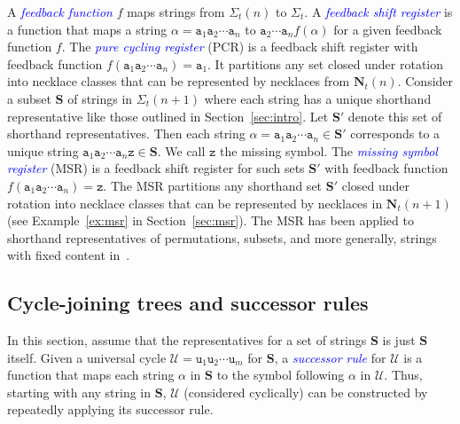 \documentclass[US-letter,USenglish,authorcolumns,autoref]{lipics-v2021}
\renewcommand{\tt} {\mathtt}
\newcommand{\bS}{\mathbf{S}}
\newcommand{\bN}{\mathbf{N}}
\newcommand{\defo}[1] {\emph{\textcolor{blue}{#1}}}
\DeclareMathOperator{\ap}{ap}
\begin{document}

   
A \defo{feedback function} $f$ maps strings from $\Sigma_t(n)$ to $\Sigma_t$.
A \defo{feedback shift register} is a function that maps a string $\alpha = \tt{a}_1\tt{a}_2 \cdots \tt{a}_n$ to $\tt{a}_2 \cdots \tt{a}_n f(\alpha)$ for a given feedback function $f$.  
The \defo{pure cycling register} (PCR) is a feedback shift register with feedback function $f(\tt{a}_1\tt{a}_2\cdots \tt{a}_n) = \tt{a}_1$.  It partitions any set closed under rotation into necklace classes that can be represented by necklaces from $\bN_t(n)$.   Consider a subset $\bS$ of strings in $\Sigma_t(n+1)$ where each string has a unique shorthand representative like those outlined in Section~\ref{sec:intro}.  Let $\bS'$ denote this set of shorthand representatives. Then each string
$\alpha = \tt{a}_1\tt{a}_2\cdots \tt{a}_n \in \bS'$ corresponds to a unique string $\tt{a}_1\tt{a}_2\cdots \tt{a}_n\tt{z} \in \bS$.  We call $\tt{z}$ the missing symbol. The 
\defo{missing symbol register} (MSR) is a feedback shift register for such sets $\bS'$ with feedback function $f(\tt{a}_1\tt{a}_2\cdots \tt{a}_n) = \tt{z}$.  The MSR partitions any shorthand set $\bS'$ closed under rotation into necklace classes that can be represented by necklaces in $\bN_t(n+1)$ (see Example~\ref{ex:msr} in Section~\ref{sec:msr}). The MSR has been applied to shorthand representatives of permutations, subsets, and more generally, strings with fixed content in~\cite{coolest}. 





\subsection{Cycle-joining trees and successor rules} \label{sec:cycle-join}

In this section, assume that the representatives for a set of strings $\bS$ is just $\bS$ itself.
%
Given a universal cycle $\mathcal{U} = \tt{u}_1\tt{u}_2 \cdots \tt{u}_m$ for  $\mathbf{S}$, a 
\defo{successor rule} for $\mathcal{U}$ is a function that maps each string $\alpha$ in $\mathbf{S}$ to the symbol following $\alpha$ in $\mathcal{U}$.  Thus, starting with any string in $\mathbf{S}$,  $\mathcal{U}$ (considered cyclically) can be constructed by repeatedly applying its successor rule.
\end{document}

